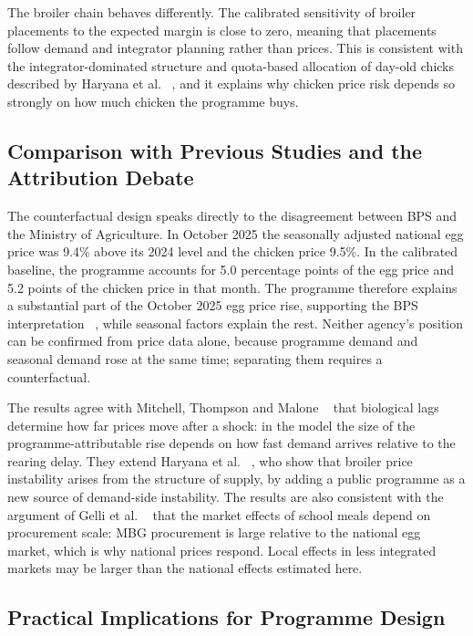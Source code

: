 \documentclass[10pt,twocolumn,a4paper]{article}
\begin{document}
The broiler chain behaves differently. The calibrated sensitivity of broiler placements to the expected margin is close to zero, meaning that placements follow demand and integrator planning rather than prices. This is consistent with the integrator-dominated structure and quota-based allocation of day-old chicks described by Haryana et al. ~\cite{haryana2026}, and it explains why chicken price risk depends so strongly on how much chicken the programme buys.


\subsection{Comparison with Previous Studies and the Attribution Debate}

The counterfactual design speaks directly to the disagreement between BPS and the Ministry of Agriculture. In October 2025 the seasonally adjusted national egg price was 9.4\% above its 2024 level and the chicken price 9.5\%. In the calibrated baseline, the programme accounts for 5.0 percentage points of the egg price and 5.2 points of the chicken price in that month. The programme therefore explains a substantial part of the October 2025 egg price rise, supporting the BPS interpretation ~\cite{bps2025}, while seasonal factors explain the rest. Neither agency's position can be confirmed from price data alone, because programme demand and seasonal demand rose at the same time; separating them requires a counterfactual.


The results agree with Mitchell, Thompson and Malone ~\cite{mitchell2024} that biological lags determine how far prices move after a shock: in the model the size of the programme-attributable rise depends on how fast demand arrives relative to the rearing delay. They extend Haryana et al. ~\cite{haryana2026}, who show that broiler price instability arises from the structure of supply, by adding a public programme as a new source of demand-side instability. The results are also consistent with the argument of Gelli et al. ~\cite{gelli2021} that the market effects of school meals depend on procurement scale: MBG procurement is large relative to the national egg market, which is why national prices respond. Local effects in less integrated markets may be larger than the national effects estimated here.


\subsection{Practical Implications for Programme Design}\label{sec:implications}
\end{document}
